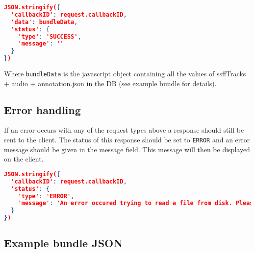 \documentclass[A4,12pt, utf8]{article}
\begin{document}
\begin{lstlisting}[caption=Reply content, language=json]
JSON.stringify({
  'callbackID': request.callbackID,
  'data': bundleData,
  'status': {
    'type': 'SUCCESS',
    'message': ''
  }
})
\end{lstlisting}
Where \texttt{bundleData} is the javascript object containing all the values of ssffTracks + audio + annotation.json in the DB (see example bundle for details).

\subsection{Error handling}

If an error occurs with any of the request types above a response should still be sent to the client. The status of this response should be set to \texttt{ERROR} and an error message should be given in the message field. This message will then be displayed on the client.

\begin{lstlisting}[caption=ERROR reply content, language=json]
JSON.stringify({
  'callbackID': request.callbackID,
  'status': {
    'type': 'ERROR',
    'message': 'An error occured trying to read a file from disk. Please make sure: /path/to/file exists or check the config...
  }
})
\end{lstlisting}

\subsection{Example bundle JSON}


\end{document}
